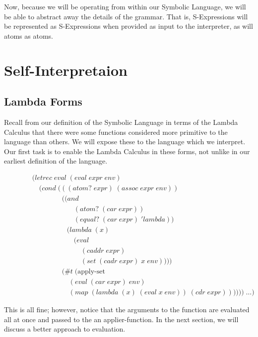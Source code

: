 Now, because we will be operating from within our Symbolic Language, we will 
be able to abstract away the details of the grammar. That is, S-Expressions 
will be represented as S-Expressions when provided as input to the 
interpreter, as will atoms as atoms.

\section{Self-Interpretaion}
\subsection{Lambda Forms}
Recall from our definition of the Symbolic Language in terms of the Lambda 
Calculus that there were some functions considered more primitive to the 
language than others. We will expose these to the language which we 
interpret. Our first task is to enable the Lambda Calculus in these forms, 
not unlike in our earliest definition of the language.

\begin{figure}[htp]
\caption{}\label{fig:lambdaCalculusEval}
\begin{align*}
& (letrec \; eval \; (eval \; expr \; env)
\\& \quad (cond \; (((atom? \; expr) \; (assoc \; expr \; env))
\\& \qquad \qquad \; ((and \; 
\\& \qquad \qquad \qquad (atom? \; (car \; expr)) \; 
\\& \qquad \qquad \qquad (equal? \; (car \; expr) \; 'lambda)) \; 
\\& \qquad \qquad \quad (lambda \; (x) \; 
\\& \qquad \qquad \qquad (eval \; 
\\& \qquad \qquad \qquad \quad (caddr \; expr) \; 
\\& \qquad \qquad \qquad \quad (set \; (cadr \; expr) \; x \; env))))
\\& \qquad \qquad \; (\#t \; (\text{apply-set} \; 
\\& \qquad \qquad \quad \; (eval \; (car \; expr) \; env) \; 
\\& \qquad \qquad \quad \; (map \; (lambda \; (x) \; (eval \; x \; env)) \; (cdr \; expr)))))) \; \dots)
\end{align*}
\end{figure}

This is all fine; however, notice that the arguments to the function are 
evaluated all at once and passed to the an applier-function. In the next 
section, we will discuss a better approach to evaluation.

